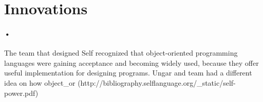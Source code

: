 \documentclass[12pt]{article}
\begin{document}
\section{Innovations}
\paragraph{•} The team that designed Self recognized that object-oriented programming languages were gaining acceptance and becoming widely used, because they offer useful implementation for designing programs. Ungar and team had a different idea on how object_or
(http://bibliography.selflanguage.org/_static/self-power.pdf)
\end{document}
